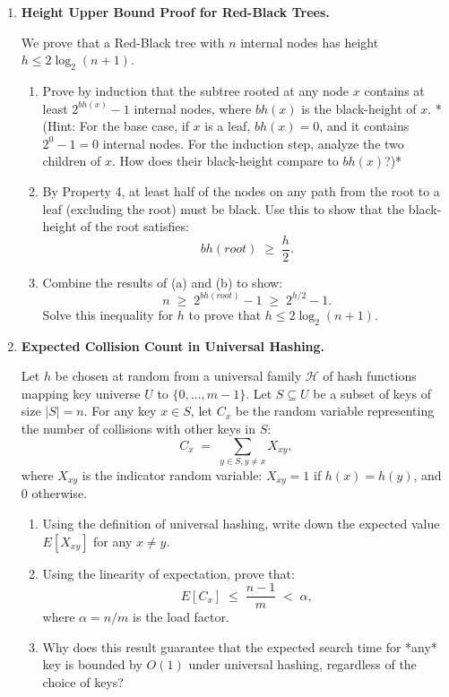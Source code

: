 \documentclass[12pt, a4paper]{book}
\begin{document}
\begin{deepbox}
\begin{enumerate}[label=\textbf{D\arabic*.}]
  \item \textbf{Height Upper Bound Proof for Red-Black Trees.}
  
        We prove that a Red-Black tree with $n$ internal nodes has height $h \le 2 \log_2(n+1)$.
        
        \begin{enumerate}[label=(\alph*)]
          \item Prove by induction that the subtree rooted at any node $x$ contains at least $2^{bh(x)} - 1$ internal nodes, where $bh(x)$ is the black-height of $x$.
                *(Hint: For the base case, if $x$ is a leaf, $bh(x) = 0$, and it contains $2^0 - 1 = 0$ internal nodes. For the induction step, analyze the two children of $x$. How does their black-height compare to $bh(x)$?)*
          \item By Property 4, at least half of the nodes on any path from the root to a leaf (excluding the root) must be black.
                Use this to show that the black-height of the root satisfies:
                \[
                  bh(root) \;\ge\; \frac{h}{2}.
                \]
          \item Combine the results of (a) and (b) to show:
                \[
                  n \;\ge\; 2^{bh(root)} - 1 \;\ge\; 2^{h/2} - 1.
                \]
                Solve this inequality for $h$ to prove that $h \le 2 \log_2(n+1)$.
        \end{enumerate}

  \item \textbf{Expected Collision Count in Universal Hashing.}
  
        Let $h$ be chosen at random from a universal family $\mathcal{H}$ of hash functions mapping key universe $U$ to $\{0, \dots, m-1\}$.
        Let $S \subseteq U$ be a subset of keys of size $|S| = n$.
        For any key $x \in S$, let $C_x$ be the random variable representing the number of collisions with other keys in $S$:
        \[
          C_x \;=\; \sum_{y \in S, y \neq x} X_{xy},
        \]
        where $X_{xy}$ is the indicator random variable: $X_{xy} = 1$ if $h(x) = h(y)$, and $0$ otherwise.
        
        \begin{enumerate}[label=(\alph*)]
          \item Using the definition of universal hashing, write down the expected value $E[X_{xy}]$ for any $x \neq y$.
          \item Using the linearity of expectation, prove that:
                \[
                  E[C_x] \;\le\; \frac{n-1}{m} \;<\; \alpha,
                \]
                where $\alpha = n/m$ is the load factor.
          \item Why does this result guarantee that the expected search time for *any* key is bounded by $O(1)$ under universal hashing, regardless of the choice of keys?
        \end{enumerate}
\end{enumerate}
\end{deepbox}
\end{document}

